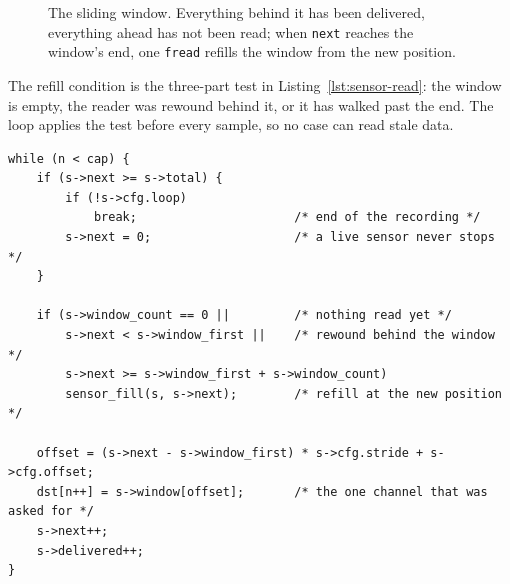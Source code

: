 \documentclass[12pt,a4paper,oneside]{report}
\begin{document}
\begin{figure}[htbp]
\centering
{}
\caption{The sliding window. Everything behind it has been delivered, everything
ahead has not been read; when \texttt{next} reaches the window's end, one
\texttt{fread} refills the window from the new position.}
\label{fig:sensor-window}
\end{figure}

The refill condition is the three-part test in Listing~\ref{lst:sensor-read}: the
window is empty, the reader was rewound behind it, or it has walked past the end.
The loop applies the test before every sample, so no case can read stale data.

\noindent\begin{minipage}{\linewidth}
\begin{lstlisting}[caption={The read loop of \texttt{sensor\_read()}, trimmed of
its error returns. A device read delivers at most one frame; aggregating frames
into a block is the caller's job.}, label={lst:sensor-read},
basicstyle=\ttfamily\footnotesize]
while (n < cap) {
    if (s->next >= s->total) {
        if (!s->cfg.loop)
            break;                      /* end of the recording */
        s->next = 0;                    /* a live sensor never stops */
    }

    if (s->window_count == 0 ||         /* nothing read yet */
        s->next < s->window_first ||    /* rewound behind the window */
        s->next >= s->window_first + s->window_count)
        sensor_fill(s, s->next);        /* refill at the new position */

    offset = (s->next - s->window_first) * s->cfg.stride + s->cfg.offset;
    dst[n++] = s->window[offset];       /* the one channel that was asked for */
    s->next++;
    s->delivered++;
}
\end{lstlisting}
\end{minipage}
\end{document}
